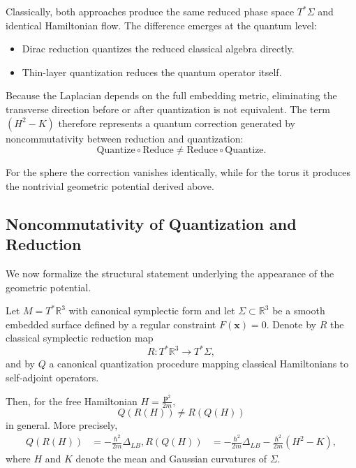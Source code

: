 Classically, both approaches produce the same reduced phase space $T^*\Sigma$ 
and identical Hamiltonian flow. The difference emerges at the quantum level:
\begin{itemize}
\item Dirac reduction quantizes the reduced classical algebra directly.
\item Thin-layer quantization reduces the quantum operator itself.
\end{itemize}

Because the Laplacian depends on the full embedding metric, eliminating the 
transverse direction before or after quantization is not equivalent. The term
$(H^2-K)$ therefore represents a quantum correction generated by 
noncommutativity between reduction and quantization:
\begin{equation}
\text{Quantize}\circ\text{Reduce} \neq \text{Reduce}\circ\text{Quantize}.
\end{equation}

For the sphere the correction vanishes identically, while for the torus it
produces the nontrivial geometric potential derived above.

\subsection{Noncommutativity of Quantization and Reduction}

We now formalize the structural statement underlying the appearance of 
the geometric potential.
\begin{theorem}
Let $M = T^*\mathbb{R}^3$ with canonical symplectic form and let 
    $\Sigma \subset \mathbb{R}^3$ be a smooth embedded surface defined
    by a regular constraint $F(\mathbf{x})=0$. Denote by $R$ the classical
    symplectic reduction map
\begin{equation}
R: T^*\mathbb{R}^3 \longrightarrow T^*\Sigma,
\end{equation}
and by $Q$ a canonical quantization procedure mapping classical 
    Hamiltonians to self-adjoint operators.

Then, for the free Hamiltonian $H = \frac{\mathbf{p}^2}{2m}$,
\begin{equation}
Q(R(H)) \neq R(Q(H))
\end{equation}
in general. More precisely,
\begin{align}
Q(R(H)) &= -\frac{\hbar^2}{2m}\Delta_{LB}, 
R(Q(H)) &= -\frac{\hbar^2}{2m}\Delta_{LB} - \frac{\hbar^2}{2m}(H^2-K),
\end{align}
where $H$ and $K$ denote the mean and Gaussian curvatures of $\Sigma$.
\end{theorem}

